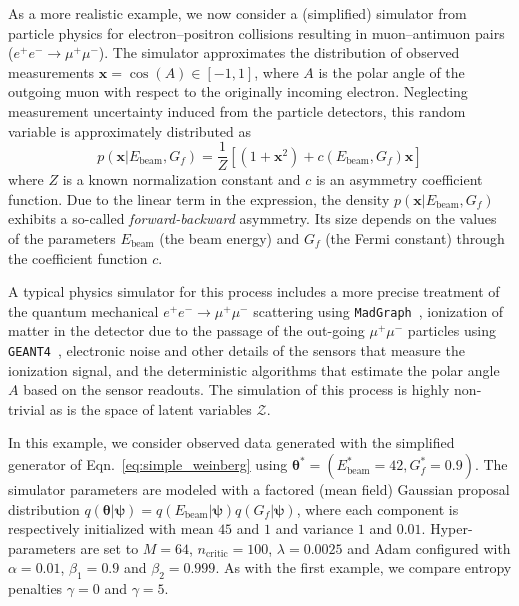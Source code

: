 \documentclass[twocolumn,superscriptaddress,aps]{revtex4-1}
\newcommand{\bftheta}{{\bm \theta}}
\newcommand{\bfpsi}{{\bm \psi}}
\theoremstyle{plain}
\begin{document}
As a more realistic example, we now consider a (simplified) simulator from
particle physics for electron--positron collisions resulting in muon--antimuon
pairs ($e^+e^- \rightarrow \mu^+\mu^-$). The simulator approximates the
distribution of observed measurements $\mathbf{x} = \cos(A) \in [-1,1]$, where $A$ is the
polar angle of the outgoing muon with respect  to the originally incoming
electron. Neglecting measurement uncertainty induced from the particle detectors,
this random variable is approximately distributed as
\begin{equation}\label{eq:simple_weinberg}
    p(\mathbf{x}|E_\text{beam}, G_f) = \frac{1}{Z} \left[ (1 + \mathbf{x}^2) + c(E_\text{beam}, G_f) \mathbf{x} \right]
\end{equation}
where $Z$ is a known normalization constant and $c$ is an asymmetry coefficient
function. Due to the linear term in the expression, the density $p(\mathbf{x} |
E_\text{beam}, G_f)$ exhibits a so-called {\it forward-backward} asymmetry.  Its
size depends on the values of the parameters $E_\text{beam}$ (the beam energy)
and $G_f$ (the Fermi constant) through the coefficient function $c$.

A typical physics simulator for this process includes a more precise treatment of the
quantum mechanical  $e^+e^- \rightarrow \mu^+\mu^-$ scattering
using \texttt{MadGraph}~\citep{Alwall:2011uj},  ionization of matter in the
detector due to the passage of the out-going $\mu^+\mu^-$ particles using
\texttt{GEANT4}~\citep{Agostinelli:2002hh}, electronic noise and other details of the sensors
that measure the ionization signal, and the deterministic algorithms that
estimate the polar angle $A$ based on the sensor readouts. The simulation of
this process is highly non-trivial as is the space of latent variables $\mathcal{Z}$.

In this example, we consider observed data generated with the simplified generator of Eqn.~\ref{eq:simple_weinberg}
using $\bftheta^* = (E_\text{beam}^*=42, G_f^*=0.9)$. The simulator parameters are modeled with a
factored (mean field) Gaussian proposal distribution $q(\bftheta|\bfpsi) = q(E_\text{beam}|\bfpsi)
q(G_f|\bfpsi)$, where each component is respectively initialized with mean $45$
and $1$ and variance $1$ and $0.01$. Hyper-parameters are set to $M=64$,
$n_\text{critic}=100$, $\lambda=0.0025$ and Adam configured with $\alpha=0.01$,
$\beta_1=0.9$ and $\beta_2=0.999$. As with the first example, we compare
entropy penalties $\gamma=0$ and $\gamma=5$.
\end{document}
